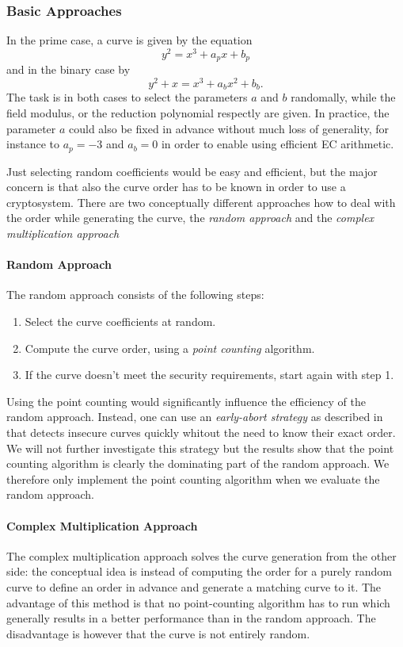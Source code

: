 \documentclass[11pt,english]{article}
\begin{document}
\subsubsection{Basic Approaches}
In the prime case, a curve is given by the equation
\begin{displaymath}
 y^2=x^3+a_px+b_p
\end{displaymath}
and in the binary case by
\begin{displaymath}
 y^2+x=x^3+a_bx^2+b_b.
\end{displaymath}
The task is in both cases to select the parameters $a$ and $b$ randomally, while the field modulus, or the reduction polynomial respectly are given. In practice, the parameter $a$ could also be fixed in advance without much loss of generality, for instance to $a_p=-3$ and $a_b=0$ in order to enable using efficient EC arithmetic.

Just selecting random coefficients would be easy and efficient, but the major concern is that also the curve order has to be known in order to use a cryptosystem. There are two conceptually different approaches how to deal with the order while generating the curve, the \emph{random approach} and the \emph{complex multiplication approach}

\paragraph{Random Approach}
The random approach consists of the following steps:
\begin{enumerate}
 \item Select the curve coefficients at random.
 \item Compute the curve order, using a \emph{point counting} algorithm.
 \item If the curve doesn't meet the security requirements, start again with step 1.
\end{enumerate}


Using the point counting would significantly influence the efficiency of the random approach. Instead, one can use an \emph{early-abort strategy} as described in \cite{satohfgh} that detects insecure curves quickly whitout the need to know their exact order. We will not further investigate this strategy but the results show that the point counting algorithm is clearly the dominating part of the random approach. We therefore only implement the point counting algorithm when we evaluate the random approach.

\paragraph{Complex Multiplication Approach}
The complex multiplication approach solves the curve generation from the other side: the conceptual idea is instead of computing the order for a purely random curve to define an order in advance and generate a matching curve to it.
The advantage of this method is that no point-counting algorithm has to run which generally results in a better performance than in the random approach. The disadvantage is however that the curve is not entirely random.
\end{document}
